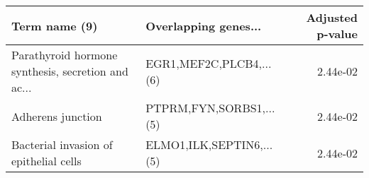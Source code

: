 \begin{tabular}{llr}
\toprule
                                     Term name (9) &     Overlapping genes... &  Adjusted p-value \\
\midrule
Parathyroid hormone synthesis, secretion and ac... &  EGR1,MEF2C,PLCB4,...(6) &          2.44e-02 \\
                                 Adherens junction &  PTPRM,FYN,SORBS1,...(5) &          2.44e-02 \\
            Bacterial invasion of epithelial cells & ELMO1,ILK,SEPTIN6,...(5) &          2.44e-02 \\
\bottomrule
\end{tabular}
